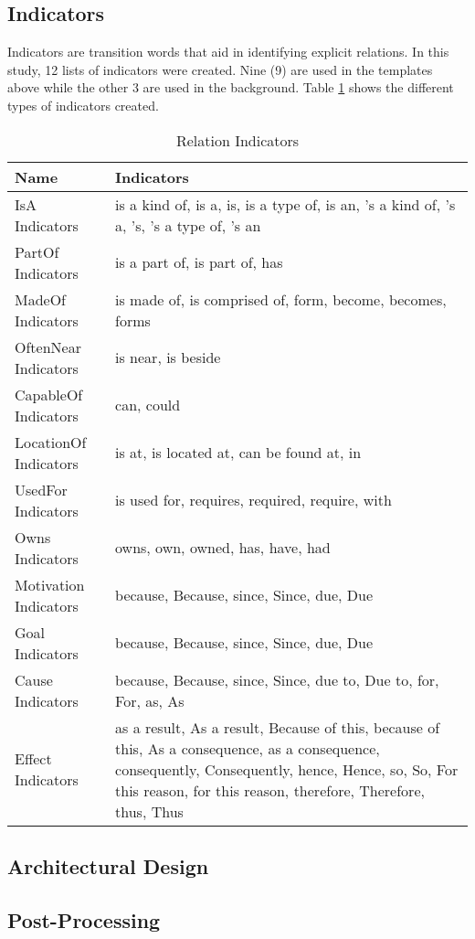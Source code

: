 \subsection{Indicators}
\label{sec:indicators}

Indicators are transition words that aid in identifying explicit relations. In this study, 12 lists of indicators were created. Nine (9) are used in the templates above while the other 3 are used in the background. Table \ref{tab:indicators} shows the different types of indicators created.

\begin{table}[H]   %
\centering
\caption{Relation Indicators} \vspace{0.25em}
\begin{tabular}{|p{3.5cm}|p{10cm}|} \hline
Name & Indicators \\ \hline
IsA Indicators				& is a kind of, is a, is, is a type of, is an, 's a kind of, 's a, 's, 's a type of, 's an \\ \hline
PartOf Indicators			& is a part of, is part of, has \\ \hline
MadeOf Indicators			& is made of, is comprised of, form, become, becomes, forms \\ \hline
OftenNear Indicators		& is near, is beside \\ \hline
CapableOf Indicators		& can, could \\ \hline
LocationOf Indicators		& is at, is located at, can be found at, in \\ \hline
UsedFor Indicators			& is used for, requires, required, require, with \\ \hline
Owns Indicators 			& owns, own, owned, has, have, had \\ \hline
Motivation Indicators		& because, Because, since, Since, due, Due \\ \hline
Goal Indicators				& because, Because, since, Since, due, Due \\ \hline
Cause Indicators			& because, Because, since, Since, due to, Due to, for, For, as, As \\ \hline
Effect Indicators			& as a result, As a result, Because of this, because of this, As a consequence, as a consequence, consequently, Consequently, 								hence, Hence, so, So, For this reason, for this reason, therefore, Therefore, thus, Thus \\ \hline
\end{tabular}
\label{tab:indicators}
\end{table}

\subsection{Architectural Design}
\label{sec:archidesign}

\subsection{Post-Processing}
\label{sec:postprocessing}







